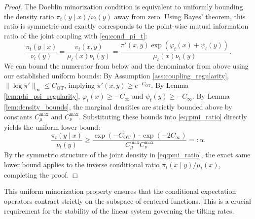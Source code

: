 \documentclass[11pt]{article}
\theoremstyle{definition}
\numberwithin{equation}{section}%
\begin{document}
{\begin{proof}
The Doeblin minorization condition is equivalent to uniformly bounding the density ratio $\pi_t(y \mid x) / \nu_t(y)$ away from zero. Using Bayes' theorem, this ratio is symmetric and exactly corresponds to the point-wise mutual information ratio of the joint coupling with \eqref{eq:cond_pi_t}:
\begin{equation}
\label{eq:pmi_ratio}
\frac{\pi_t(y \mid x)}{\nu_t(y)} = \frac{\pi_t(x,y)}{\mu_t(x)\nu_t(y)} = \frac{\pi'(x,y) \exp(\varphi_t(x) + \psi_t(y))}{\mu_t(x)\nu_t(y)}.
\end{equation}
We can bound the numerator from below and the denominator from above using our established uniform bounds:
By Assumption \ref{ass:coupling_regularity}, $\|\log \pi'\|_\infty \le C_\mathrm{OT}$, implying $\pi'(x,y) \ge e^{-C_\mathrm{OT}}$.
By Lemma \ref{lem:phi_psi_regularity}, $\varphi_t(x) \ge -C_\infty$ and $\psi_t(y) \ge -C_\infty$.
By Lemma \ref{lem:density_bounds}, the marginal densities are strictly bounded above by constants $C_{\mu}^{\max}$ and $C_{\nu}^{\max}$.
Substituting these bounds into \eqref{eq:pmi_ratio} directly yields the uniform lower bound:
\[
\frac{\pi_t(y \mid x)}{\nu_t(y)} \ge \frac{\exp(-C_\mathrm{OT}) \cdot \exp(-2C_\infty)}{C_{\mu}^{\max} C_{\nu}^{\max}} =: \alpha.
\]
By the symmetric structure of the joint density in \eqref{eq:pmi_ratio}, the exact same lower bound applies to the inverse conditional ratio $\pi_t(x \mid y) / \mu_t(x)$, completing the proof.
\end{proof}

This uniform minorization property ensures that the conditional expectation operators contract strictly on the subspace of centered functions. This is a crucial requirement for the stability of the linear system governing the tilting rates.

}
\end{document}
